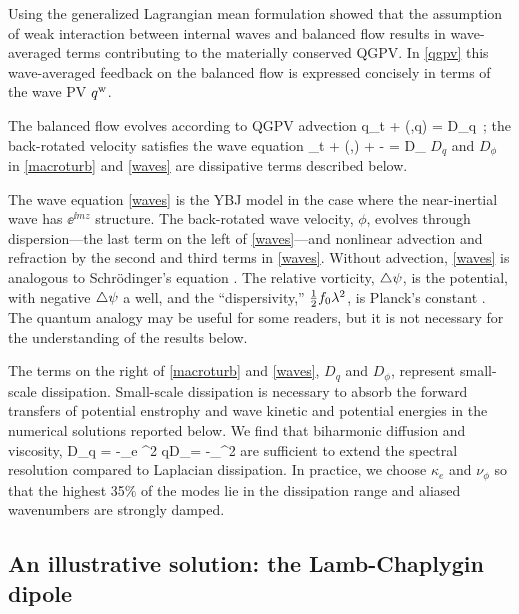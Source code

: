 \documentclass{jfm}
\newcommand{\NIW}{near-inertial wave}
\begin{document}
Using the generalized  Lagrangian mean formulation \citet{buhler_mcintyre1998}
showed that the assumption of weak interaction between internal waves and balanced
flow results in wave-averaged terms contributing to the materially conserved
QGPV. In \eqref{qgpv} this wave-averaged
feedback on the balanced  flow is  expressed concisely in terms of the wave PV  $q^{\mathrm{w}}$.

The balanced flow evolves according to  QGPV advection
\beq
\label{macroturb}
q_t + \sJ(\psi,q) = D_q\, ;
\eeq
the back-rotated velocity satisfies the  wave  equation
\beq
\label{waves}
\phi_t + \sJ(\psi,\phi) +  \phi {}\ze -  \disp \lap \phi
 = D_\phi\per
\eeq
$D_q$ and $D_\phi$ in \eqref{macroturb} and \eqref{waves}  are dissipative terms
described below.

The wave equation \eqref{waves} is the YBJ  model in the
case where the \NIW{}  has $\ee^{\ii mz}$ structure. The back-rotated wave velocity, $\phi$,
evolves through dispersion---the last term on the left of  \eqref{waves}---and
nonlinear advection and refraction by the second and third terms in
\eqref{waves}.  Without advection, \eqref{waves} is analogous to Schr\"odinger's
equation \citep[e.g.,][ page 51]{landau_lifshitz2013}. The relative vorticity,
$\triangle\psi$, is the potential, with negative $\triangle \psi$ a  well, and the
``dispersivity,'' $\tfrac{1}{2} f_0\lambda^2$, is Planck's constant \citep{balmforth1998, balmforth1999, danioux_etal2015}.
The quantum  analogy may be  useful for some readers, but it is not necessary for
the understanding of the results below.

The terms on the right of
\eqref{macroturb}  and \eqref{waves}, $D_q$ and $D_\phi$, represent small-scale
dissipation.  Small-scale dissipation is necessary to absorb the forward transfers
of potential enstrophy and wave kinetic and potential energies in the numerical
solutions reported below. We find that biharmonic diffusion and viscosity,
\beq\label{biharm}
D_q = -\kappa_e \lap^2 q\qquad{}\qquad D_\phi = -\nu_\phi \lap^2 \phi\com
\eeq
are sufficient to extend the spectral resolution compared to Laplacian dissipation.
In practice, we choose $\kappa_e$ and $\nu_\phi$ so that  the highest 35$\%$
of the  modes lie in the dissipation range and aliased wavenumbers are strongly
damped.



\subsection{An illustrative solution: the Lamb-Chaplygin dipole}
\end{document}
